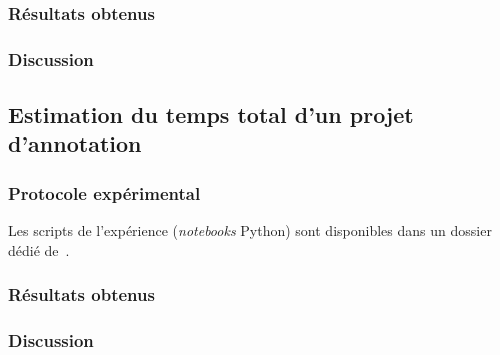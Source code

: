 		\subsubsection{Résultats obtenus}

		\subsubsection{Discussion}
	
	\subsection{Estimation du temps total d'un projet d'annotation}
	\label{section:4.3.4-ETUDE-COUTS-TOTAL}
	
		\subsubsection{Protocole expérimental}
		

			\begin{leftBarInformation}
				Les scripts de l'expérience (\textit{notebooks} Python) sont disponibles dans un dossier dédié de~\cite{schild:cognitivefactory-interactive-clustering-comparative-study:2021}.
			\end{leftBarInformation}

		\subsubsection{Résultats obtenus}

		\subsubsection{Discussion}